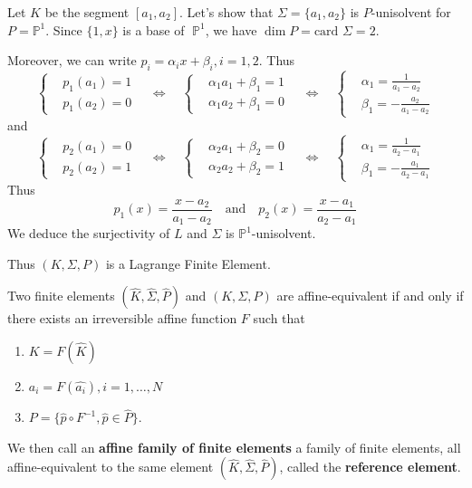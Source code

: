 \begin{Example}
	Let $K$ be the segment $[a_1,a_2]$. Let's show that $\Sigma=\{a_1,a_2\}$ is $P$-unisolvent for $P=\mathbb{P}^1$. Since $\{1,x\}$ is a base of $\;\mathbb{P}^1$, we have $\dim P = \text{card } \Sigma = 2$. 
	
	Moreover, we can write $p_i=\alpha_i x+\beta_i, i=1,2$. Thus
	\begin{equation*}
		\left\{\begin{aligned}
			&p_1(a_1)=1 \\
			&p_1(a_2)=0
		\end{aligned}\right. \quad \iff	\quad
		\left\{\begin{aligned}
			&\alpha_1 a_1+\beta_1=1 \\
			&\alpha_1 a_2+\beta_1=0
		\end{aligned}\right. \quad \iff \quad
		\left\{\begin{aligned}
		&\alpha_1 = \frac{1}{a_1-a_2} \\
		&\beta_1 = -\frac{a_2}{a_1-a_2}
	\end{aligned}\right.
	\end{equation*}
	and
	\begin{equation*}
		\left\{\begin{aligned}
			&p_2(a_1)=0 \\
			&p_2(a_2)=1
		\end{aligned}\right. \quad \iff	\quad
		\left\{\begin{aligned}
			&\alpha_2 a_1+\beta_2=0 \\
			&\alpha_2 a_2+\beta_2=1
		\end{aligned}\right. \quad \iff \quad
		\left\{\begin{aligned}
			&\alpha_1 = \frac{1}{a_2-a_1} \\
			&\beta_1 = -\frac{a_1}{a_2-a_1}
		\end{aligned}\right.
	\end{equation*}
	Thus
	\begin{equation*}
		p_1(x)=\frac{x-a_2}{a_1-a_2} \quad \text{and} \quad p_2(x)=\frac{x-a_1}{a_2-a_1}
	\end{equation*}
	We deduce the surjectivity of $L$ and $\Sigma$ is $\mathbb{P}^1$-unisolvent. 
	
	Thus $(K,\Sigma,P)$ is a Lagrange Finite Element.
	\end{Example}

	\begin{Def}
		Two finite elements $(\hat{K},\hat{\Sigma},\hat{P})$ and $(K,\Sigma,P)$ are affine-equivalent if and only if there exists an irreversible affine function $F$ such that
		\begin{enumerate}[label=\textbullet]
			\item $K=F(\hat{K})$
			\item $a_i=F(\hat{a_i}),i=1,\dots,N$ 
			\item $P=\{\hat{p}\circ F^{-1},\hat{p}\in\hat{P}\}$.
		\end{enumerate}
		We then call an \textbf{affine family of finite elements} a family of finite elements, all affine-equivalent to the same element $(\hat{K},\hat{\Sigma},\hat{P})$, called the \textbf{reference element}.
	\end{Def}

